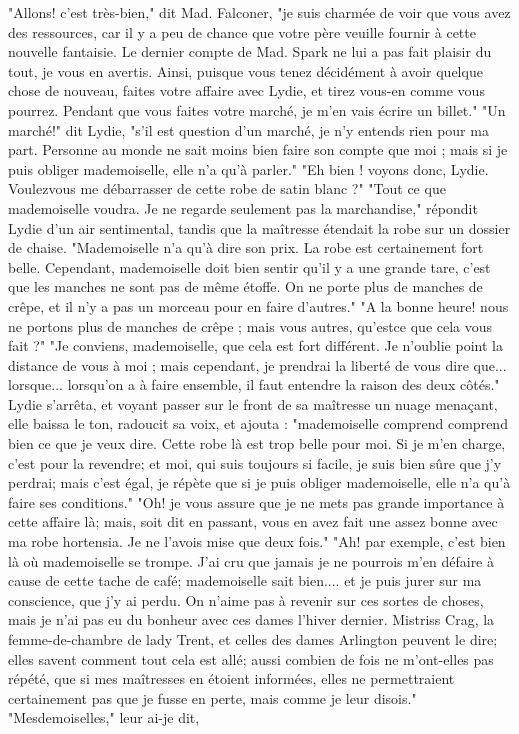 "Allons! c'est très-bien," dit Mad. Falconer, "je suis charmée de voir que vous avez des ressources, car il y a peu de chance que votre père veuille fournir à cette nouvelle fantaisie. Le dernier compte de Mad. Spark ne lui a pas fait plaisir du tout, je vous en avertis. Ainsi, puisque vous tenez décidément à avoir quelque chose de nouveau, faites votre affaire avec Lydie, et tirez vous-en comme vous pourrez. Pendant que vous faites votre marché, je m'en vais écrire un billet."
"Un marché!" dit Lydie, "s'il est question d'un marché, je n'y entends rien pour ma part. Personne au monde ne sait moins bien\setcounter{page}{268} faire son compte que moi ; mais si je puis obliger mademoiselle, elle n'a qu'à parler."
"Eh bien ! voyons donc, Lydie. Voulezvous me débarrasser de cette robe de satin blanc ?"
"Tout ce que mademoiselle voudra. Je ne regarde seulement pas la marchandise," répondit Lydie d'un air sentimental, tandis que la maîtresse étendait la robe sur un dossier de chaise. "Mademoiselle n'a qu'à dire son prix. La robe est certainement fort belle. Cependant, mademoiselle doit bien sentir qu'il y a une grande tare, c'est que les manches ne sont pas de même étoffe. On ne porte plus de manches de crêpe, et il n'y a pas un morceau pour en faire d'autres."
"A la bonne heure! nous ne portons plus de manches de crêpe ; mais vous autres, qu'estce que cela vous fait ?"
"Je conviens, mademoiselle, que cela est fort différent. Je n'oublie point la distance de vous à moi ; mais cependant, je prendrai la liberté de vous dire que... lorsque... lorsqu'on a à faire ensemble, il faut entendre la raison des deux côtés." Lydie s'arrêta, et voyant passer sur le front de sa maîtresse un nuage menaçant, elle baissa le ton, radoucit sa voix, et ajouta : "mademoiselle comprend\setcounter{page}{269}
comprend bien ce que je veux dire. Cette robe là est trop belle pour moi. Si je m'en charge, c'est pour la revendre; et moi, qui suis toujours si facile, je suis bien sûre que j'y perdrai; mais c'est égal, je répète que si je puis obliger mademoiselle, elle n'a qu'à faire ses conditions."
"Oh! je vous assure que je ne mets pas grande importance à cette affaire là; mais, soit dit en passant, vous en avez fait une assez bonne avec ma robe hortensia. Je ne l'avois mise que deux fois."
"Ah! par exemple, c'est bien là où mademoiselle se trompe. J'ai cru que jamais je ne pourrois m'en défaire à cause de cette tache de café; mademoiselle sait bien.... et je puis jurer sur ma conscience, que j'y ai perdu. On n'aime pas à revenir sur ces sortes de choses, mais je n'ai pas eu du bonheur avec ces dames l'hiver dernier. Mistriss Crag, la femme-de-chambre de lady Trent, et celles des dames Arlington peuvent le dire; elles savent comment tout cela est allé; aussi combien de fois ne m'ont-elles pas répété, que si mes maîtresses en étoient informées, elles ne permettraient certainement pas que je fusse en perte, mais comme je leur disois." "Mesdemoiselles," leur ai-je dit,
